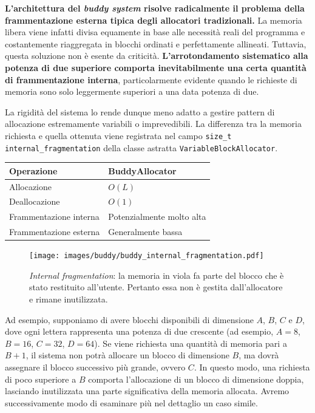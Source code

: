 \textbf{L’architettura del \textit{buddy system} risolve radicalmente il problema della frammentazione esterna tipica degli allocatori tradizionali.} La memoria libera viene infatti divisa equamente in base alle necessità reali del programma e costantemente riaggregata in blocchi ordinati e perfettamente allineati. Tuttavia, questa soluzione non è esente da criticità. \textbf{L'arrotondamento sistematico alla potenza di due superiore comporta inevitabilmente una certa quantità di frammentazione interna}, particolarmente evidente quando le richieste di memoria sono solo leggermente superiori a una data potenza di due.

La rigidità del sistema lo rende dunque meno adatto a gestire pattern di allocazione estremamente variabili o imprevedibili. La differenza tra la memoria richiesta e quella ottenuta viene registrata nel campo \texttt{size\_t internal\_fragmentation} della classe astratta \texttt{VariableBlockAllocator}.

\begin{center}
\begin{tabular}{|l|l|}
\hline
Operazione & BuddyAllocator \\
\hline
Allocazione & $O(L)$ \\
Deallocazione & $O(1)$ \\
Frammentazione interna & Potenzialmente molto alta \\
Frammentazione esterna & Generalmente bassa \\
\hline
\end{tabular}
\end{center}

\begin{figure}[H]
    \centering
    \texttt{[image: images/buddy/buddy\_internal\_fragmentation.pdf]}
    \caption{\textit{Internal fragmentation}: la memoria in viola fa parte del blocco che è stato restituito all'utente. Pertanto essa non è gestita dall'allocatore e rimane inutilizzata.}
    \label{fig:buddy_internal_fragmentation}
\end{figure}

Ad esempio, supponiamo di avere blocchi disponibili di dimensione $A$, $B$, $C$ e $D$, dove ogni lettera rappresenta una potenza di due crescente (ad esempio, $A = 8$, $B = 16$, $C = 32$, $D = 64$). Se viene richiesta una quantità di memoria pari a $B+1$, il sistema non potrà allocare un blocco di dimensione $B$, ma dovrà assegnare il blocco successivo più grande, ovvero $C$. In questo modo, una richiesta di poco superiore a $B$ comporta l'allocazione di un blocco di dimensione doppia, lasciando inutilizzata una parte significativa della memoria allocata. Avremo successivamente modo di esaminare più nel dettaglio un caso simile.


